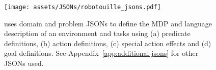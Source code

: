 \begin{figure}[!h]
    \centering
    \texttt{[image: assets/JSONs/robotouille\_jsons.pdf]}
    \caption{\robotouille{} uses domain and problem JSONs to define the MDP and language description of an environment and tasks using (a) predicate definitions, (b) action definitions, (c) special action effects and (d) goal definitions. See Appendix~\ref{app:additional-jsons} for other JSONs used.
    }
    \label{fig:jsons}
\end{figure}